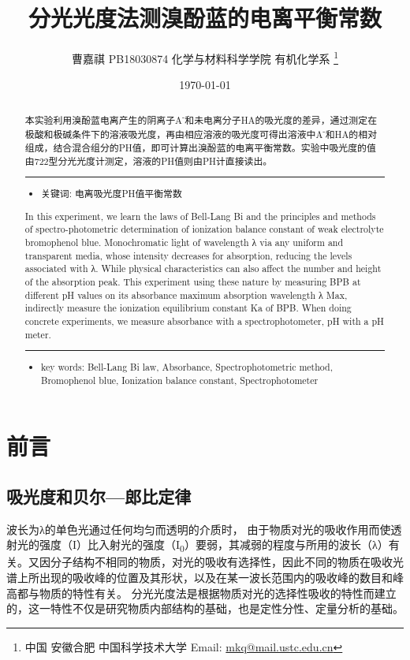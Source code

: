\documentclass[11pt]{report}
\author{曹嘉祺 PB18030874 化学与材料科学学院 有机化学系 \thanks{中国 安徽合肥 中国科学技术大学 Email: \href{mailto:mkq@mail.ustc.edu.cn}{mkq@mail.ustc.edu.cn}}}
\date{\today}
\title{分光光度法测溴酚蓝的电离平衡常数}
\begin{document}
\maketitle
\tableofcontents

\begin{abstract}
本实验利用溴酚蓝电离产生的阴离子A\textsuperscript{-}和未电离分子HA的吸光度的差异，通过测定在极酸和极碱条件下的溶液吸光度，再由相应溶液的吸光度可得出溶液中A\textsuperscript{-}和HA的相对组成，结合混合组分的PH值，即可计算出溴酚蓝的电离平衡常数。实验中吸光度的值由722型分光光度计测定，溶液的PH值则由PH计直接读出。


\noindent\rule{\textwidth}{0.5pt}
\begin{itemize}
\item 关键词: 电离\quad 吸光度\quad PH值\quad 平衡常数
\end{itemize}
\end{abstract}
\begin{abstract}
In this experiment, we learn the laws of Bell-Lang Bi and the principles and methods of spectro-photometric determination of ionization balance constant of weak electrolyte bromophenol blue. Monochromatic light of wavelength λ via any uniform and transparent media, whose intensity decreases for absorption, reducing the levels associated with λ. While physical characteristics can also affect the number and height of the absorption peak. This experiment using these nature by measuring BPB at different pH values on its absorbance maximum absorption wavelength λ Max, indirectly measure the ionization equilibrium constant Ka of BPB. When doing concrete experiments, we measure absorbance with a spectrophotometer, pH with a pH meter.

\noindent\rule{\textwidth}{0.5pt}

\begin{itemize}
\item key words:  Bell-Lang Bi law, Absorbance, Spectrophotometric method, Bromophenol blue, Ionization balance constant, Spectrophotometer
\end{itemize}
\end{abstract}
\part{前言}
\label{sec:org9675cd3}
\chapter{吸光度和贝尔—郎比定律}
\label{sec:org6457f41}
波长为λ的单色光通过任何均匀而透明的介质时，
由于物质对光的吸收作用而使透射光的强度（I）比入射光的强度（I\textsubscript{0}）要弱，其减弱的程度与所用的波长（λ）有关。又因分子结构不相同的物质，对光的吸收有选择性，因此不同的物质在吸收光谱上所出现的吸收峰的位置及其形状，以及在某一波长范围内的吸收峰的数目和峰高都与物质的特性有关。
分光光度法是根据物质对光的选择性吸收的特性而建立的，这一特性不仅是研究物质内部结构的基础，也是定性分性、定量分析的基础。
\end{document}
